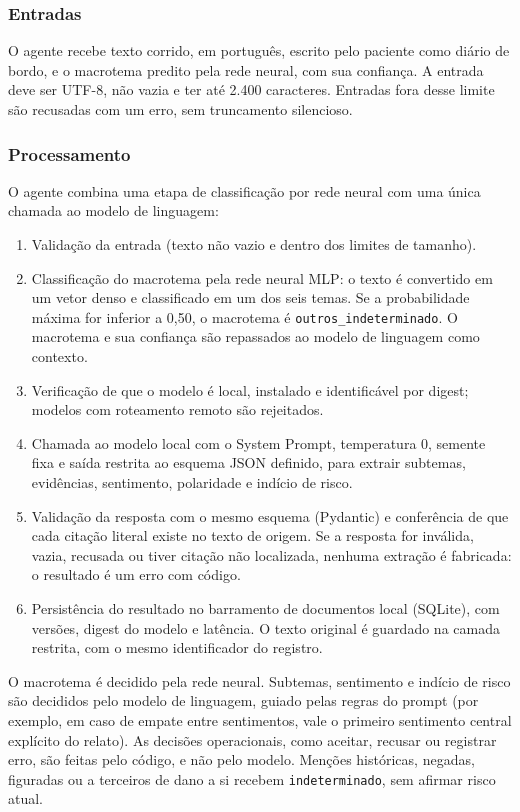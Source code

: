 \documentclass[12pt,a4paper]{article}
\begin{document}
\subsubsection{Entradas}
O agente recebe texto corrido, em português, escrito pelo paciente como diário de bordo, e o
macrotema predito pela rede neural, com sua confiança. A entrada deve ser UTF-8, não vazia e
ter até 2.400 caracteres. Entradas fora desse limite são recusadas com um erro,
sem truncamento silencioso. %

\subsubsection{Processamento}
O agente combina uma etapa de classificação por rede neural com uma única chamada ao modelo
de linguagem:
\begin{enumerate}
  \item Validação da entrada (texto não vazio e dentro dos limites de tamanho).
  \item Classificação do macrotema pela rede neural MLP: o texto é convertido em um vetor
        denso e classificado em um dos seis temas. Se a probabilidade máxima for inferior a
        0,50, o macrotema é \texttt{outros\_indeterminado}. O macrotema e sua confiança são
        repassados ao modelo de linguagem como contexto.
  \item Verificação de que o modelo é local, instalado e identificável por digest; modelos
        com roteamento remoto são rejeitados.
  \item Chamada ao modelo local com o System Prompt, temperatura 0, semente fixa e saída
        restrita ao esquema JSON definido, para extrair subtemas, evidências, sentimento,
        polaridade e indício de risco.
  \item Validação da resposta com o mesmo esquema (Pydantic) e conferência de que cada
        citação literal existe no texto de origem. Se a resposta for inválida, vazia, recusada
        ou tiver citação não localizada, nenhuma extração é fabricada: o resultado é um erro
        com código.
  \item Persistência do resultado no barramento de documentos local (SQLite), com versões,
        digest do modelo e latência. O texto original é guardado na camada restrita, com o
        mesmo identificador do registro.
\end{enumerate}
O macrotema é decidido pela rede neural. Subtemas, sentimento e indício de risco são
decididos pelo modelo de linguagem, guiado pelas regras do prompt (por exemplo, em caso de
empate entre sentimentos, vale o primeiro sentimento central explícito do relato). As decisões
operacionais, como aceitar, recusar ou registrar erro, são feitas pelo código, e não pelo
modelo. Menções históricas, negadas, figuradas ou a terceiros de dano a si recebem
\texttt{indeterminado}, sem afirmar risco atual.
\end{document}
